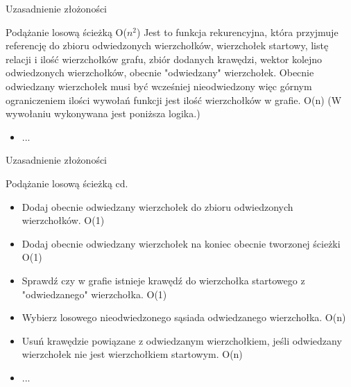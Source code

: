 \documentclass{beamer}
\begin{document}
\begin{frame}{Uzasadnienie złożoności}
\begin{block}{Podążanie losową ścieżką O($n^2$)}
\justifying
    Jest to funkcja rekurencyjna, która przyjmuje referencję do zbioru odwiedzonych wierzchołków, wierzchołek startowy, listę relacji i ilość wierzchołków grafu, zbiór dodanych krawędzi, wektor kolejno odwiedzonych wierzchołków, obecnie "odwiedzany" wierzchołek. Obecnie odwiedzany wierzchołek musi być wcześniej nieodwiedzony więc górnym ograniczeniem ilości wywołań funkcji jest ilość wierzchołków w grafie. O(n) (W wywołaniu wykonywana jest poniższa logika.) \\
    \begin{itemize}
        \item ...
    \end{itemize}
\end{block}
\end{frame}

\begin{frame}{Uzasadnienie złożoności}
\begin{block}{Podążanie losową ścieżką cd.}
\justifying
    \begin{itemize}
        \item Dodaj obecnie odwiedzany wierzchołek do zbioru odwiedzonych wierzchołków. O(1) \\
        \item Dodaj obecnie odwiedzany wierzchołek na koniec obecnie tworzonej ścieżki O(1) \\
        \item Sprawdź czy w grafie istnieje krawędź do wierzchołka startowego z "odwiedzanego" wierzchołka. O(1) \\
        \item Wybierz losowego nieodwiedzonego sąsiada odwiedzanego wierzchołka. O(n) \\
        \item Usuń krawędzie powiązane z odwiedzanym wierzchołkiem, jeśli odwiedzany wierzchołek nie jest wierzchołkiem startowym. O(n) \\
        \item ... \\
    \end{itemize}
\end{block}
\end{frame}
\end{document}
